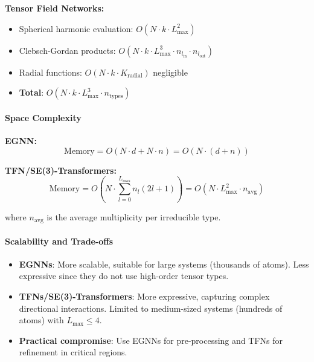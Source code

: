 \textbf{Tensor Field Networks:}
\begin{itemize}
    \item Spherical harmonic evaluation: $O(N \cdot k \cdot L_{\max}^2)$
    \item Clebsch-Gordan products: $O(N \cdot k \cdot L_{\max}^3 \cdot n_{l_{\text{in}}} \cdot n_{l_{\text{out}}})$
    \item Radial functions: $O(N \cdot k \cdot K_{\text{radial}})$ negligible
    \item \textbf{Total}: $O(N \cdot k \cdot L_{\max}^3 \cdot n_{\text{types}})$
\end{itemize}

\paragraph{Space Complexity}

\textbf{EGNN:}
\begin{equation}
\text{Memory} = O(N \cdot d + N \cdot n) = O(N \cdot (d + n))
\end{equation}

\textbf{TFN/SE(3)-Transformers:}
\begin{equation}
\text{Memory} = O\left(N \cdot \sum_{l=0}^{L_{\max}} n_l (2l+1)\right) = O(N \cdot L_{\max}^2 \cdot n_{\text{avg}})
\end{equation}

where $n_{\text{avg}}$ is the average multiplicity per irreducible type.

\paragraph{Scalability and Trade-offs}

\begin{itemize}
    \item \textbf{EGNNs}: More scalable, suitable for large systems (thousands of atoms). Less expressive since they do not use high-order tensor types.

    \item \textbf{TFNs/SE(3)-Transformers}: More expressive, capturing complex directional interactions. Limited to medium-sized systems (hundreds of atoms) with $L_{\max} \leq 4$.

    \item \textbf{Practical compromise}: Use EGNNs for pre-processing and TFNs for refinement in critical regions.
\end{itemize}

